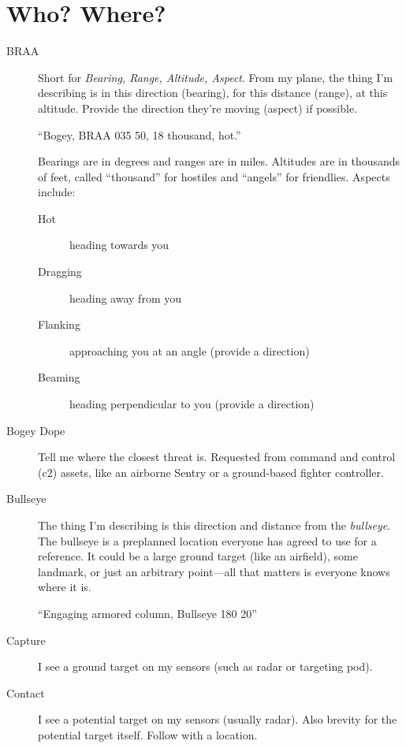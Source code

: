 \section{Who? Where?}

\begin{description}
\item[BRAA] Short for \emph{Bearing, Range, Altitude, Aspect}.
    From my plane, the thing I'm describing is in this direction
    (bearing), for this distance (range), at this altitude.
    Provide the direction they're moving (aspect) if possible.

    ``Bogey, BRAA 035 50, 18 thousand, hot.''

    Bearings are in degrees and ranges are in miles.
    Altitudes are in thousands of feet, called ``thousand'' for hostiles
    and ``angels'' for friendlies. Aspects include:
    \begin{description}
    \item[Hot] heading towards you
    \item[Dragging] heading away from you
    \item[Flanking] approaching you at an angle (provide a direction)
    \item[Beaming] heading perpendicular to you (provide a direction)
    \end{description}

\item[Bogey Dope] Tell me where the closest threat is.
    Requested from command and control \ac{(c2)} assets,
    like an airborne  Sentry
    or a ground-based fighter controller.

\item[Bullseye] The thing I'm describing is this direction and distance
    from the \emph{bullseye}.
    The bullseye is a preplanned location everyone has agreed to use for
    a reference. It could be a large ground target (like an airfield),
    some landmark, or just an arbitrary point---all that matters is
    everyone knows where it is.

    ``Engaging armored column, Bullseye 180 20''

\item[Capture] I see a ground target on my sensors (such as radar
    or targeting pod).

\item[Contact] I see a potential target on my sensors (usually radar).
    Also brevity for the potential target itself.
    Follow with a location.


\end{description}
